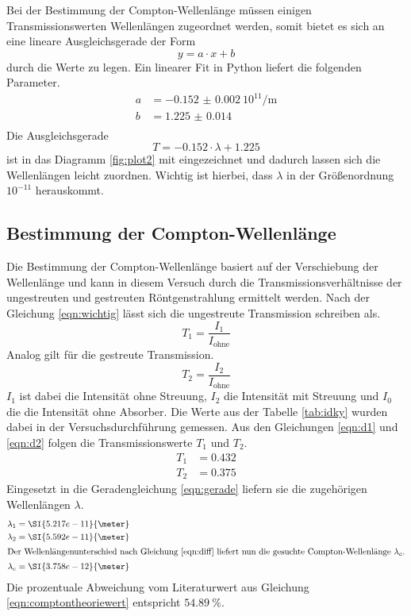 Bei der Bestimmung der Compton-Wellenlänge müssen einigen Transmissionswerten Wellenlängen zugeordnet werden, somit bietet es sich an eine lineare Ausgleichsgerade der
Form
\begin{equation}
y = a \cdot x + b
\end{equation}
durch die Werte zu legen.
Ein linearer Fit in Python liefert die folgenden Parameter.
\begin{align*}
a &= \SI{-0.152(2)}{{10^{11}}\per\meter}\\
b &= \SI{1.225(14)}{}\\
\end{align*}
Die Ausgleichsgerade
\begin{equation}
\label{eqn:gerade}
T = -0.152 \cdot \lambda + 1.225
\end{equation}
ist in das Diagramm \ref{fig:plot2} mit eingezeichnet und dadurch lassen sich die Wellenlängen leicht zuordnen. Wichtig ist hierbei,
dass $\lambda$ in der Größenordnung $10^{-11}$ herauskommt.

\subsection{Bestimmung der Compton-Wellenlänge}
Die Bestimmung der Compton-Wellenlänge basiert auf der Verschiebung der Wellenlänge und kann in diesem Versuch durch die Transmissionsverhältnisse
der ungestreuten und gestreuten Röntgenstrahlung ermittelt werden. Nach der Gleichung \eqref{eqn:wichtig} lässt sich die ungestreute Transmission schreiben als.
\begin{equation}
\label{eqn:d1}
T_{1} = \frac{I_{1}}{I_{\text{ohne}}}
\end{equation}
\label{eqn:d2}
Analog gilt für die gestreute Transmission.
\begin{equation}
T_{2} = \frac{I_{2}}{I_{\text{ohne}}}
\end{equation}
$I_{1}$ ist dabei die Intensität ohne Streuung, $I_{2}$ die Intensität mit Streuung  und $I_{0}$ die die Intensität ohne Absorber.
Die Werte aus der Tabelle \ref{tab:idky} wurden dabei in der Versuchsdurchführung gemessen.
Aus den Gleichungen \eqref{eqn:d1} und \eqref{eqn:d2} folgen die Transmissionswerte $T_{1}$ und $T_{2}$.
\begin{align*}
T_{1} &= 0.432 \\
T_{2} &= 0.375
\end{align*}
Eingesetzt in die Geradengleichung \eqref{eqn:gerade} liefern sie die zugehörigen Wellenlängen $\lambda$.
\begin{align}
\lambda_{1} &=  \SI{5.217e-11}{\meter} \\
\lambda_{2} &=  \SI{5.592e-11}{\meter} \\
\intertext{Der Wellenlängenunterschied nach Gleichung \eqref{eqn:diff} liefert nun die gesuchte Compton-Wellenlänge $\lambda_{c}$.}
\lambda_{c} &= \SI{3.758e-12}{\meter} 
\end{align}
Die prozentuale Abweichung vom Literaturwert aus Gleichung \eqref{eqn:comptontheoriewert} entspricht $\SI{54.89}{\percent}$.


